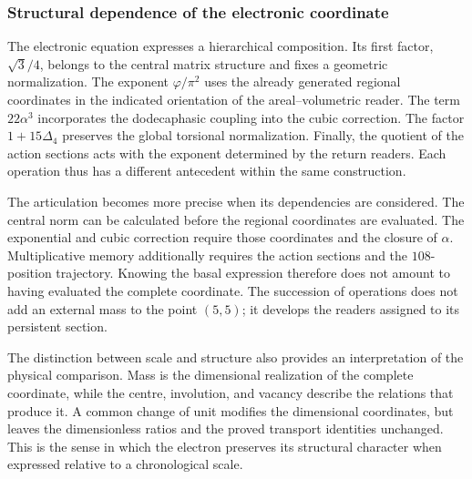 \subsubsection{Structural dependence of the electronic coordinate}

The electronic equation expresses a hierarchical composition. Its first
factor, \(\sqrt3/4\), belongs to the central matrix structure and fixes
a geometric normalization. The exponent \(\varphi/\pi^2\) uses the
already generated regional coordinates in the indicated orientation of the
areal--volumetric reader. The term \(22\alpha^3\) incorporates the dodecaphasic
coupling into the cubic correction. The factor \(1+15\Delta_4\) preserves
the global torsional normalization. Finally, the quotient of the action
sections acts with the exponent determined by the return readers.
Each operation thus has a different antecedent within the same
construction.

The articulation becomes more precise when its dependencies are considered.
The central norm can be calculated before the regional coordinates
are evaluated. The exponential and cubic correction require those
coordinates and the closure of \(\alpha\). Multiplicative memory additionally
requires the action sections and the \(108\)-position trajectory.
Knowing the basal expression therefore does not amount to having evaluated
the complete coordinate. The succession of operations does not add an
external mass to the point \((5,5)\); it develops the readers assigned to its
persistent section.

The distinction between scale and structure also provides an
interpretation of the physical comparison. Mass is the dimensional
realization of the complete coordinate, while the centre, involution,
and vacancy describe the relations that produce it. A common change
of unit modifies the dimensional coordinates, but leaves the dimensionless
ratios and the proved transport identities unchanged.
This is the sense in which the electron preserves its structural character
when expressed relative to a chronological scale.

